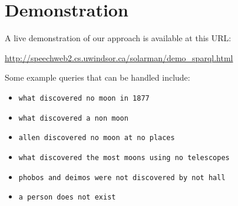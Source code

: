 \documentclass[logoontitle,tabu,supertabular,aspectratio=43]{preney-uwindsor-beamer}
\begin{document}


	\section{Demonstration}
	\begin{frame}{\insertsection}
		A live demonstration of our approach is available at this URL:
		\begin{center}
			\url{http://speechweb2.cs.uwindsor.ca/solarman/demo_sparql.html}
		\end{center}
		Some example queries that can be handled include:
		\begin{itemize}
			\item \texttt{what discovered no moon in 1877}
			\item \texttt{what discovered a non moon}
			\item \texttt{allen discovered no moon at no places}
			\item \texttt{what discovered the most moons using no telescopes}
			\item \texttt{phobos and deimos were not discovered by not hall}
			\item \texttt{a person does not exist}
		\end{itemize}
	\end{frame}
\end{document}
